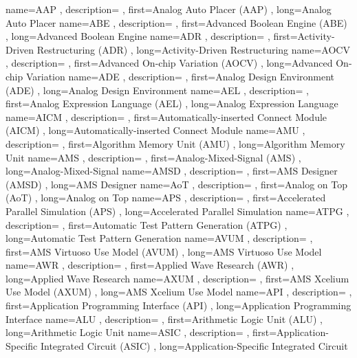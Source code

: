 \usepackage[]{glossaries}
\makeglossaries


{ name={AAP}
, description={}
, first={Analog Auto Placer (AAP)}
, long={Analog Auto Placer}
}
{ name={ABE}
, description={}
, first={Advanced Boolean Engine (ABE)}
, long={Advanced Boolean Engine}
}
{ name={ADR}
, description={}
, first={Activity-Driven Restructuring (ADR)}
, long={Activity-Driven Restructuring}
}
{ name={AOCV}
, description={}
, first={Advanced On-chip Variation (AOCV)}
, long={Advanced On-chip Variation}
}
{ name={ADE}
, description={}
, first={Analog Design Environment (ADE)}
, long={Analog Design Environment}
}
{ name={AEL}
, description={}
, first={Analog Expression Language (AEL)}
, long={Analog Expression Language}
}
{ name={AICM}
, description={}
, first={Automatically-inserted Connect Module (AICM)}
, long={Automatically-inserted Connect Module}
}
{ name={AMU}
, description={}
, first={Algorithm Memory Unit (AMU)}
, long={Algorithm Memory Unit}
}
{ name={AMS}
, description={}
, first={Analog-Mixed-Signal (AMS)}
, long={Analog-Mixed-Signal}
}
{ name={AMSD}
, description={}
, first={AMS Designer (AMSD)}
, long={AMS Designer}
}
{ name={AoT}
, description={}
, first={Analog on Top (AoT)}
, long={Analog on Top}
}
{ name={APS}
, description={}
, first={Accelerated Parallel Simulation (APS)}
, long={Accelerated Parallel Simulation}
}
{ name={ATPG}
, description={}
, first={Automatic Test Pattern Generation (ATPG)}
, long={Automatic Test Pattern Generation}
}
{ name={AVUM}
, description={}
, first={AMS Virtuoso Use Model (AVUM)}
, long={AMS Virtuoso Use Model}
}
{ name={AWR}
, description={}
, first={Applied Wave Research (AWR)}
, long={Applied Wave Research}
}
{ name={AXUM}
, description={}
, first={AMS Xcelium Use Model (AXUM)}
, long={AMS Xcelium Use Model}
}
{ name={API}
, description={}
, first={Application Programming Interface (API)}
, long={Application Programming Interface}
}
{ name={ALU}
, description={}
, first={Arithmetic Logic Unit (ALU)}
, long={Arithmetic Logic Unit}
}
{ name={ASIC}
, description={}
, first={Application-Specific Integrated Circuit (ASIC)}
, long={Application-Specific Integrated Circuit}
}
